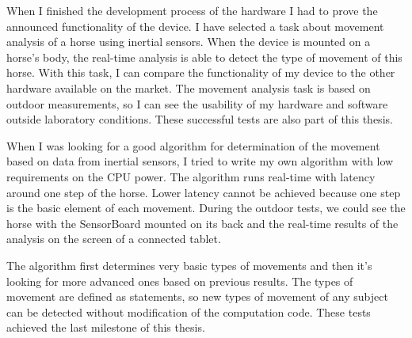 When I finished the development process of the hardware I had to prove the announced functionality of the device. I have selected a task about movement analysis of a horse using inertial sensors. When the device is mounted on a horse's body, the real-time analysis is able to detect the type of movement of this horse. With this task, I can compare the functionality of my device to the other hardware available on the market. The movement analysis task is based on outdoor measurements, so I can see the usability of my hardware and software outside laboratory conditions. These successful tests are also part of this thesis.

When I was looking for a good algorithm for determination of the movement based on data from inertial sensors, I tried to write my own algorithm with low requirements on the CPU power. The algorithm runs real-time with latency around one step of the horse. Lower latency cannot be achieved because one step is the basic element of each movement. During the outdoor tests, we could see the horse with the SensorBoard mounted on its back and the real-time results of the analysis on the screen of a connected tablet.

The algorithm first determines very basic types of movements and then it's looking for more advanced ones based on previous results. The types of movement are defined as statements, so new types of movement of any subject can be detected without modification of the computation code. These tests achieved the last milestone of this thesis.
